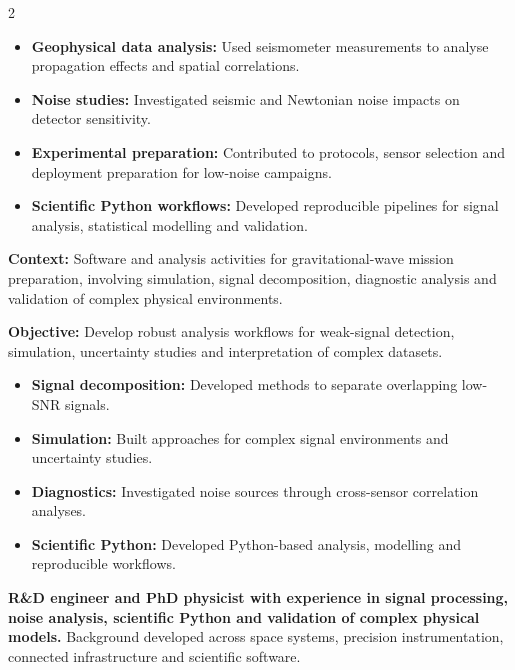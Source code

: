 \documentclass[8pt,a4paper,ragged2e,withhyper]{altacv}
\begin{document}
\begin{paracol}{2}
\begin{itemize}
  \item \textbf{Geophysical data analysis:} Used seismometer measurements to analyse propagation effects and spatial correlations.
  \item \textbf{Noise studies:} Investigated seismic and Newtonian noise impacts on detector sensitivity.
  \item \textbf{Experimental preparation:} Contributed to protocols, sensor selection and deployment preparation for low-noise campaigns.
  \item \textbf{Scientific Python workflows:} Developed reproducible pipelines for signal analysis, statistical modelling and validation.
\end{itemize}

\divider


\textbf{Context:} Software and analysis activities for gravitational-wave mission preparation, involving simulation, signal decomposition, diagnostic analysis and validation of complex physical environments.

\textbf{Objective:} Develop robust analysis workflows for weak-signal detection, simulation, uncertainty studies and interpretation of complex datasets.

\begin{itemize}
  \item \textbf{Signal decomposition:} Developed methods to separate overlapping low-SNR signals.
  \item \textbf{Simulation:} Built approaches for complex signal environments and uncertainty studies.
  \item \textbf{Diagnostics:} Investigated noise sources through cross-sensor correlation analyses.
  \item \textbf{Scientific Python:} Developed Python-based analysis, modelling and reproducible workflows.
\end{itemize}

\switchcolumn


\textbf{R\&D engineer and PhD physicist with experience in signal processing, noise analysis, scientific Python and validation of complex physical models.} Background developed across space systems, precision instrumentation, connected infrastructure and scientific software.


\end{paracol}
\end{document}
